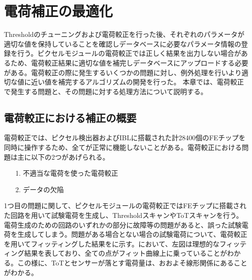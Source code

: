 \chapter{電荷補正の最適化}
\label{sec:chap4}
Thresholdのチューニングおよび電荷較正を行った後、それぞれのパラメータが適切な値を保持していることを確認しデータベースに必要なパラメータ情報の登録を行う。ピクセルモジュールの電荷較正では正しく結果を出力しない場合があるため、電荷較正結果に適切な値を補完しデータベースにアップロードする必要がある。電荷較正の際に発生するいくつかの問題に対し、例外処理を行いより適切な値に近い値を補完するアルゴリズムの開発を行った。
本章では、電荷較正で発生する問題と、その問題に対する処理方法について説明する。

\section{電荷較正における補正の概要}
\label{sec:hoseigaiyou}

電荷較正では、ピクセル検出器およびIBLに搭載された計28400個のFEチップを同時に操作するため、全てが正常に機能しないことがある。電荷較正における問題は主に以下の2つがあげられる。

\begin{itemize}
  \item[1. ] 不適当な電荷を使った電荷較正
  \item[2. ] データの欠陥
\end{itemize}

1つ目の問題に関して、ピクセルモジュールの電荷較正ではFEチップに搭載された回路を用いて試験電荷を生成し、ThresholdスキャンやToTスキャンを行う。電荷生成のための回路のいずれかの部分に故障等の問題があると、誤った試験電荷を生成してしまう。問題がある場合とない場合の試験電荷について、電荷較正を用いてフィッティングした結果をに示す。において、左図は理想的なフィッティング結果を表しており、全ての点がフィット曲線上に乗っていることがわかる。この様に、ToTとセンサーが落とす電荷量は、おおよそ線形関係にあることがわかる。

